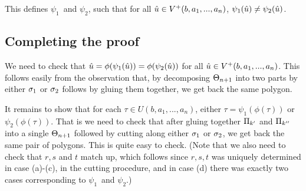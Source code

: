 This defines $\psi_1$ and $\psi_2$, such that for all $\hat{u} \in
V^+(b,a_1,...,a_n)$, $\psi_1(\hat{u}) \ne \psi_2(\hat{u})$.

\subsection{Completing the proof}
We need to check that $\hat{u} = \phi(\psi_1(\hat{u})) = \phi(\psi_2(\hat{u}))$ for all 
$\hat{u} \in V^+(b, a_1,...,a_n)$. This follows easily from the observation that, by
decomposing $\Theta_{n+1}$ into two parts by either $\sigma_1$ or $\sigma_2$ follows by
gluing them together, we get back the same polygon.

It remains to show that for each $\tau \in U(b,a_1,...,a_n)$, either $\tau =
\psi_1(\phi(\tau))$ or $\psi_2(\phi(\tau))$. That is we need to check that after
gluing together $\Pi_{k'}$ and $\Pi_{k''}$ into a single $\Theta_{n+1}$ followed by
cutting along either $\sigma_1$ or $\sigma_2$, we get back the same pair of polygons.
This is quite easy to check. (Note that we also need to check that $r,s$ and $t$
match up, which follows since $r,s,t$ was uniquely determined in case
(a)-(c), in the cutting procedure, and in case (d) there was exactly two cases
corresponding to $\psi_1$ and $\psi_2$.)

